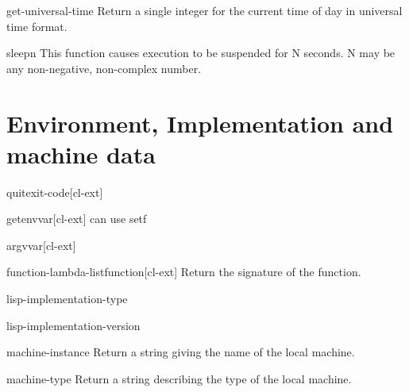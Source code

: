 \documentclass[10pt,english]{book}
\begin{document}
\begin{function}{get-universal-time}{}
  Return a single integer for the current time of day in universal time
format.
\end{function}

\begin{function}{sleep}{n}
  This function causes execution to be suspended for N seconds. N may
  be any non-negative, non-complex number.
\end{function}



\chapter{Environment, Implementation and machine data}
\label{cha:impl-mach-data}

\begin{function}{quit}{\op exit-code}[cl-ext]
  
\end{function}

\begin{function}{getenv}{var}[cl-ext]
  can use setf
\end{function}

\begin{function}{argv}{var}[cl-ext]
  
\end{function}

\begin{function}{function-lambda-list}{function}[cl-ext]
  Return the signature of the function.
\end{function}

\begin{function}{lisp-implementation-type}{}
  
\end{function}

\begin{function}{lisp-implementation-version}{}
  
\end{function}

\begin{function}{machine-instance}{}
  Return a string giving the name of the local machine.
\end{function}

\begin{function}{machine-type}{}
  Return a string describing the type of the local machine.
\end{function}
\end{document}
